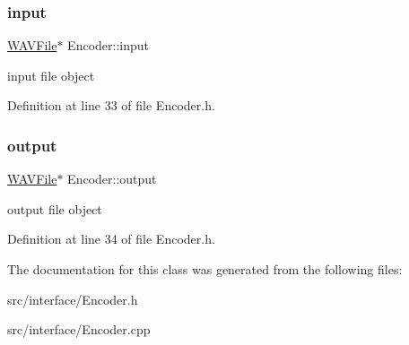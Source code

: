 \subsubsection{\texorpdfstring{input}{input}}
{\footnotesize\ttfamily \hyperlink{class_w_a_v_file}{W\+A\+V\+File}$\ast$ Encoder\+::input}

input file object 

Definition at line 33 of file Encoder.\+h.

\mbox{\label{class_encoder_ac4d4774d75750c1fdddd3740b7f30985}} 
\subsubsection{\texorpdfstring{output}{output}}
{\footnotesize\ttfamily \hyperlink{class_w_a_v_file}{W\+A\+V\+File}$\ast$ Encoder\+::output}

output file object 

Definition at line 34 of file Encoder.\+h.



The documentation for this class was generated from the following files\+:\begin{DoxyCompactItemize}
\item 
src/interface/Encoder.\+h\item 
src/interface/Encoder.\+cpp\end{DoxyCompactItemize}
